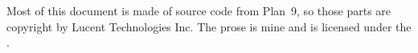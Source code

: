 Most of this document is made of source code from Plan~9, so
those parts are copyright by Lucent Technologies Inc.
The prose is mine and is licensed under the \license.

